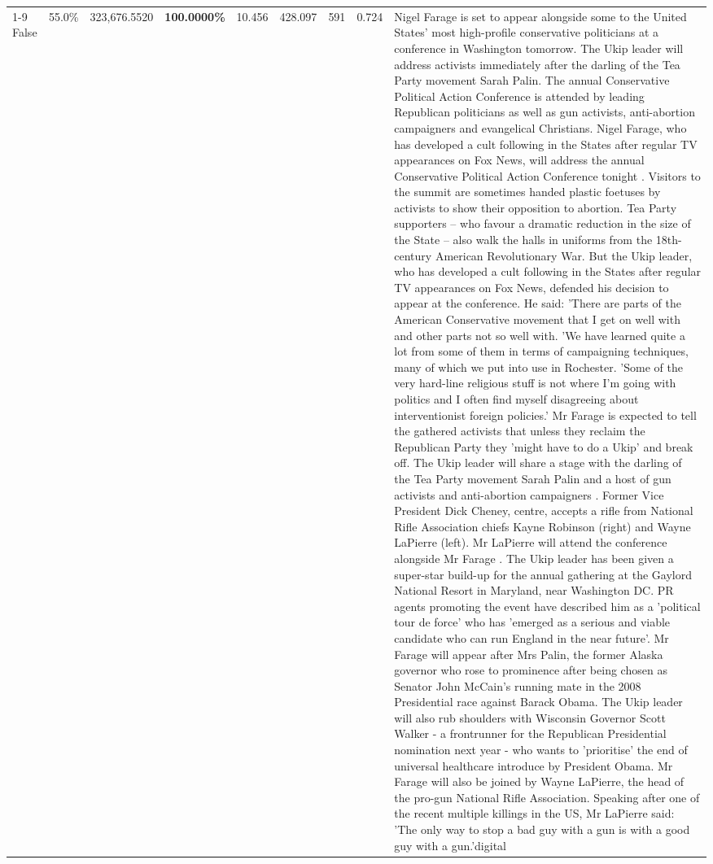 \begin{table}[H]
\begin{tabular}{lllrlllll}
\cline{1-9}
False & 55.0\% & 323,676.5520 & \bfseries \color{red} 100.0000\% & 10.456 & 428.097 & 591 & 0.724 & Nigel Farage is set to appear alongside some to the United States' most high-profile conservative politicians at a conference in Washington tomorrow. The Ukip leader will address activists immediately after the darling of the Tea Party movement Sarah Palin. The annual Conservative Political Action Conference is attended by leading Republican politicians as well as gun activists, anti-abortion campaigners and evangelical Christians. Nigel Farage, who has developed a cult following in the States after regular TV appearances on Fox News, will address the annual Conservative Political Action Conference tonight . Visitors to the summit are sometimes handed plastic foetuses by activists to show their opposition to abortion. Tea Party supporters – who favour a dramatic reduction in the size of the State – also walk the halls in uniforms from the 18th-century American Revolutionary War. But the Ukip leader, who has developed a cult following in the States after regular TV appearances on Fox News, defended his decision to appear at the conference. He said: 'There are parts of the American Conservative movement that I get on well with and other parts not so well with. 'We have learned quite a lot from some of them in terms of campaigning techniques, many of which we put into use in Rochester. 'Some of the very hard-line religious stuff is not where I'm going with politics and I often find myself disagreeing about interventionist foreign policies.' Mr Farage is expected to tell the gathered activists that unless they reclaim the Republican Party they 'might have to do a Ukip' and break off. The Ukip leader will share a stage with the darling of the Tea Party movement Sarah Palin and a host of gun activists and anti-abortion campaigners . Former Vice President Dick Cheney, centre, accepts a rifle from National Rifle Association chiefs Kayne Robinson (right) and Wayne LaPierre (left). Mr LaPierre will attend the conference alongside Mr Farage . The Ukip leader has been given a super-star build-up for the annual gathering at the Gaylord National Resort in Maryland, near Washington DC. PR agents promoting the event have described him as a 'political tour de force' who has 'emerged as a serious and viable candidate who can run England in the near future'. Mr Farage will appear after Mrs Palin, the former Alaska governor who rose to prominence after being chosen as Senator John McCain's running mate in the 2008 Presidential race against Barack Obama. The Ukip leader will also rub shoulders with Wisconsin Governor Scott Walker - a frontrunner for the Republican Presidential nomination next year - who wants to 'prioritise' the end of universal healthcare introduce by President Obama. Mr Farage will also be joined by Wayne LaPierre, the head of the pro-gun National Rifle Association. Speaking after one of the recent multiple killings in the US, Mr LaPierre said: 'The only way to stop a bad guy with a gun is with a good guy with a gun.'digital \\

\end{tabular}
\end{table}
